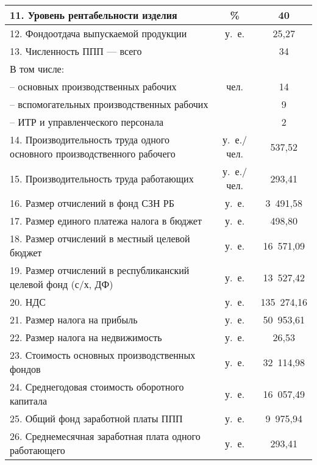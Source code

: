 {\begin{longtable}{| m{10.2cm} | c | c |}
      11. Уровень рентабельности изделия & \% & 40 \\
      \hline

      12. Фондоотдача выпускаемой продукции & у.~е. & 25,27 \\
      \hline

      13. Численность ППП --- всего & \multirow{5}{*}{чел.} & 34 \\
      В том числе: & & \\
      -- основных производственных рабочих & & 14 \\
      -- вспомогательных производственных рабочих & & 9 \\ \hline
      -- ИТР и управленческого персонала & чел. & 2 \\
      \hline

      14. Производительность труда одного \newline
      основного производственного рабочего
      & у.~е./чел. & 537,52 \\
      \hline

      15. Производительность труда работающих
      & у.~е./чел. & 293,41 \\
      \hline

      16. Размер отчислений в фонд СЗН РБ
      & у.~е. & 3~491,58 \\
      \hline

      17. Размер единого платежа налога в бюджет
      & у.~е. & 498,80 \\
      \hline

      18. Размер отчислений в местный целевой бюджет
      & у.~е. & 16~571,09 \\
      \hline

      19. Размер отчислений в республиканский целевой фонд \newline (с/х, ДФ)
      & у.~е. & 13~527,42 \\
      \hline

      20. НДС
      & у.~е. & 135~274,16 \\
      \hline

      21. Размер налога на прибыль
      & у.~е. & 50~953,61 \\
      \hline

      22. Размер налога на недвижимость
      & у.~е. & 26,53 \\
      \hline

      23. Стоимость основных производственных фондов
      & у.~е. & 32~114,98 \\
      \hline

      24. Среднегодовая стоимость оборотного капитала
      & у.~е. & 16~057,49 \\
      \hline

      25. Общий фонд заработной платы ППП
      & у.~е. & 9~975,94 \\
      \hline

      26. Среднемесячная заработная плата одного \newline работающего
      & у.~е. & 293,41 \\
      \hline
\end{longtable}
}
